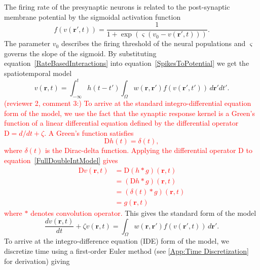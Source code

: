 \documentclass[review,authoryear,3p]{elsarticle}
\newcommand{\dean}[1]{\textcolor{red}{#1}}
\begin{document}
The firing rate of the presynaptic neurons is related to the post-synaptic membrane potential by the sigmoidal activation function 
\begin{equation}
	\label{ActivationFunction} f\left( v\left( \mathbf{r}', t \right) \right) = \frac{1}{1 + \exp \left( \varsigma \left( v_0 - v\left(\mathbf{r}',t\right) \right) \right)}. 
\end{equation}
The parameter $v_0$ describes the firing threshold of the neural populations and $\varsigma$ governs the slope of the sigmoid. By substituting equation~\ref{RateBasedInteractions} into equation~\ref{SpikesToPotential} we get the spatiotemporal model 
\begin{equation}
	\label{FullDoubleIntModel} v\left(\mathbf{r},t\right) =
	\int_{-\infty}^t 
	h\left(t - t'\right) \int_\Omega
	w\left(\mathbf{r},\mathbf{r}'\right) 
	f\left( v\left( \mathbf{r}',t' \right)\right)
	\, d\mathbf{r}'dt'.
\end{equation}
\dean{(reviewer 2, comment 3:) To arrive at the standard integro-differential equation form of the model, we use the fact that the synaptic response kernel is a Green's function of a linear differential equation defined by the differential operator $\textrm{D}=d/dt + \zeta$. A Green's function satisfies
\begin{equation}
	\label{GreensFuncDef} \textrm{D}h\left( t \right) = \delta \left( t \right), 
\end{equation} 
where $\delta(t)$ is the Dirac-delta function. Applying the differential operator $\textrm{D}$ to equation~\ref{FullDoubleIntModel} gives
\begin{align}
 \textrm{D}v\left(\mathbf r,t\right)&= \textrm{D}\left(h\ast g\right)\left(\mathbf r,t\right)\\
&=\left(\textrm{D}h\ast g\right)\left(\mathbf r,t\right)\\
&=\left(\delta \left(t\right)\ast g\right)\left(\mathbf r,t\right)\\
&=g\left(\mathbf r,t\right)
\end{align}
where $\ast$ denotes convolution operator.} This gives the standard form of the model
\begin{equation}
	\label{FinalFormContinuous} 
	\frac{dv\left( \mathbf{r},t \right)}{dt} + \zeta v\left( \mathbf{r},t \right) = \int_\Omega {w\left( \mathbf{r},\mathbf{r}' \right)f\left( {v\left( \mathbf{r}',t \right)} \right)\, d\mathbf{r}'}. 
\end{equation}
To arrive at the integro-difference equation (IDE) form of the model, we discretize time using a first-order Euler method (see \ref{App:Time Discretization} for derivation) giving 
\end{document}
